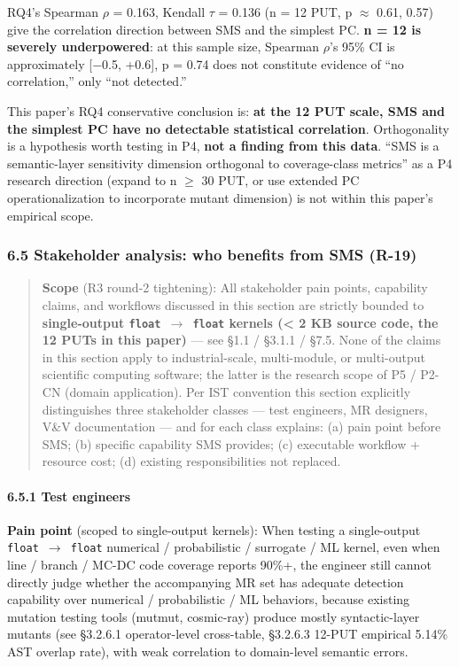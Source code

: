 \documentclass[review,12pt,authoryear]{elsarticle}
\begin{document}
RQ4's Spearman $\rho$ = 0.163, Kendall $\tau$ = 0.136 (n = 12 PUT, p $\approx$ 0.61, 0.57)
give the correlation direction between SMS and the simplest PC.
\textbf{n = 12 is severely underpowered}: at this sample size, Spearman
$\rho$'s 95\% CI is approximately {[}−0.5, +0.6{]}, p = 0.74 does not
constitute evidence of ``no correlation,'' only ``not detected.''

This paper's RQ4 conservative conclusion is: \textbf{at the 12 PUT
scale, SMS and the simplest PC have no detectable statistical
correlation}. Orthogonality is a hypothesis worth testing in P4,
\textbf{not a finding from this data}. ``SMS is a semantic-layer
sensitivity dimension orthogonal to coverage-class metrics'' as a P4
research direction (expand to n $\geq$ 30 PUT, or use extended PC
operationalization to incorporate mutant dimension) is not within this
paper's empirical scope.

\subsubsection{6.5 Stakeholder analysis: who benefits from SMS
(R-19)}\label{stakeholder-analysis-who-benefits-from-sms-r-19}

\begin{quote}
\textbf{Scope} (R3 round-2 tightening): All stakeholder pain points,
capability claims, and workflows discussed in this section are strictly
bounded to \textbf{single-output \texttt{float\ $\to$\ float} kernels
(\textless{} 2 KB source code, the 12 PUTs in this paper)} --- see §1.1
/ §3.1.1 / §7.5. None of the claims in this section apply to
industrial-scale, multi-module, or multi-output scientific computing
software; the latter is the research scope of P5 / P2-CN (domain
application). Per IST convention this section explicitly distinguishes
three stakeholder classes --- test engineers, MR designers, V\&V
documentation --- and for each class explains: (a) pain point before
SMS; (b) specific capability SMS provides; (c) executable workflow +
resource cost; (d) existing responsibilities not replaced.
\end{quote}

\paragraph{6.5.1 Test engineers}\label{test-engineers}

\textbf{Pain point} (scoped to single-output kernels): When testing a
single-output \texttt{float\ $\to$\ float} numerical / probabilistic /
surrogate / ML kernel, even when line / branch / MC-DC code coverage
reports 90\%+, the engineer still cannot directly judge whether the
accompanying MR set has adequate detection capability over numerical /
probabilistic / ML behaviors, because existing mutation testing tools
(mutmut, cosmic-ray) produce mostly syntactic-layer mutants (see
§3.2.6.1 operator-level cross-table, §3.2.6.3 12-PUT empirical 5.14\%
AST overlap rate), with weak correlation to domain-level semantic
errors.
\end{document}
